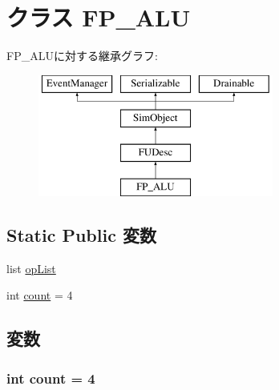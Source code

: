 \hypertarget{classFuncUnitConfig_1_1FP__ALU}{
\section{クラス FP\_\-ALU}
\label{classFuncUnitConfig_1_1FP__ALU}
}
FP\_\-ALUに対する継承グラフ:\begin{figure}[H]
\begin{center}
\leavevmode
\includegraphics[height=4cm]{classFuncUnitConfig_1_1FP__ALU}
\end{center}
\end{figure}
\subsection*{Static Public 変数}
\begin{DoxyCompactItemize}
\item 
list \hyperlink{classFuncUnitConfig_1_1FP__ALU_a31b2f9e3ac9a504397b140f513c469cc}{opList}
\item 
int \hyperlink{classFuncUnitConfig_1_1FP__ALU_ad43c3812e6d13e0518d9f8b8f463ffcf}{count} = 4
\end{DoxyCompactItemize}


\subsection{変数}
\hypertarget{classFuncUnitConfig_1_1FP__ALU_ad43c3812e6d13e0518d9f8b8f463ffcf}{
\subsubsection[{count}]{\setlength{\rightskip}{0pt plus 5cm}int {\bf count} = 4}}
\label{classFuncUnitConfig_1_1FP__ALU_ad43c3812e6d13e0518d9f8b8f463ffcf}


